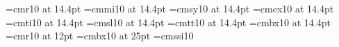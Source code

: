%

\font\fteenrm=cmr10 at 14.4pt
\font\fteeni=cmmi10 at 14.4pt
\font\fteensy=cmsy10 at 14.4pt
\font\fteenex=cmex10 at 14.4pt
\font\fteenit=cmti10 at 14.4pt
\font\fteensl=cmsl10 at 14.4pt
\font\fteentt=cmtt10 at 14.4pt
\font\fteenbf=cmbx10 at 14.4pt
\font\twelverm=cmr10 at 12pt
\font\ttlfont=cmbx10 at 25pt
\font\amfont=cmssi10 %

\def\tenpoint{\def\rm{\fam0\tenrm}%
  \textfont0=\tenrm  \scriptfont0=\sevenrm  \scriptscriptfont0=\fiverm
  \textfont1=\teni   \scriptfont1=\seveni   \scriptscriptfont1=\fivei
  \textfont2=\tensy  \scriptfont2=\sevensy  \scriptscriptfont2=\fivesy
  \textfont3=\tenex  \scriptfont3=\tenex    \scriptscriptfont3=\tenex
  \textfont\itfam=\tenit   \def\it{\fam\itfam\tenit}%
  \textfont\slfam=\tensl   \def\sl{\fam\slfam\tensl}%
  \textfont\ttfam=\tentt   \def\tt{\fam\ttfam\tentt}%
  \textfont\bffam=\tenbf   \scriptfont\bffam=\sevenbf
     \scriptscriptfont\bffam=\fivebf   \def\bf{\fam\bffam\tenbf}%
  \tt %
  \let\ss=\tensy      \let\af=\tensy
  \normalbaselineskip=12pt
  \def\parsdef{10pt plus 3pt minus 3pt}
  \parindent 20pt\parskip\parsdef
  \setbox\strutbox=\hbox{\vrule height 8.5pt depth 3.5pt width 0pt}%
  \let\sc=\eightrm \let\big=\tenbig  \normalbaselines\rm}

